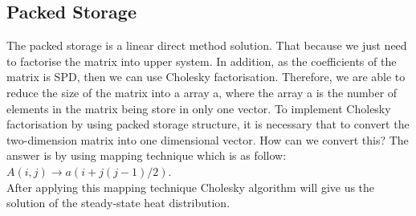 \documentclass[12pt,a4paper]{article}
\begin{document}
\subsection{Packed Storage}
The packed storage is a linear direct method solution. That because we just need to factorise the matrix into upper system. In addition, as the coefficients of the matrix is SPD, then we can use Cholesky factorisation. Therefore, we are able to reduce the size of the matrix into a array a, where the array a is the number of elements in the matrix being store in only one vector. To implement Cholesky factorisation by using packed storage structure, it is necessary that to convert the two-dimension matrix into one dimensional vector. How can we convert this? The answer is by using mapping technique which is as follow: $A(i,j) \to a(i+j(j-1)/2)$. 
\\
After applying this mapping technique Cholesky algorithm will give us the solution of the steady-state heat distribution. 
\end{document}
